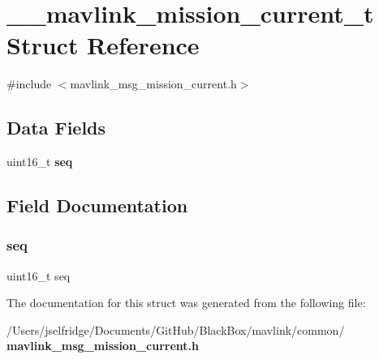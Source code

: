 \section{\+\_\+\+\_\+mavlink\+\_\+mission\+\_\+current\+\_\+t Struct Reference}
\label{struct____mavlink__mission__current__t}


{\ttfamily \#include $<$mavlink\+\_\+msg\+\_\+mission\+\_\+current.\+h$>$}

\subsection*{Data Fields}
\begin{DoxyCompactItemize}
\item 
uint16\+\_\+t \textbf{ seq}
\end{DoxyCompactItemize}


\subsection{Field Documentation}
\mbox{\label{struct____mavlink__mission__current__t_a0a97914b75ed3ab7d0e13d8b200d758a}} 
\subsubsection{seq}
{\footnotesize\ttfamily uint16\+\_\+t seq}



The documentation for this struct was generated from the following file\+:\begin{DoxyCompactItemize}
\item 
/\+Users/jselfridge/\+Documents/\+Git\+Hub/\+Black\+Box/mavlink/common/\textbf{ mavlink\+\_\+msg\+\_\+mission\+\_\+current.\+h}\end{DoxyCompactItemize}
